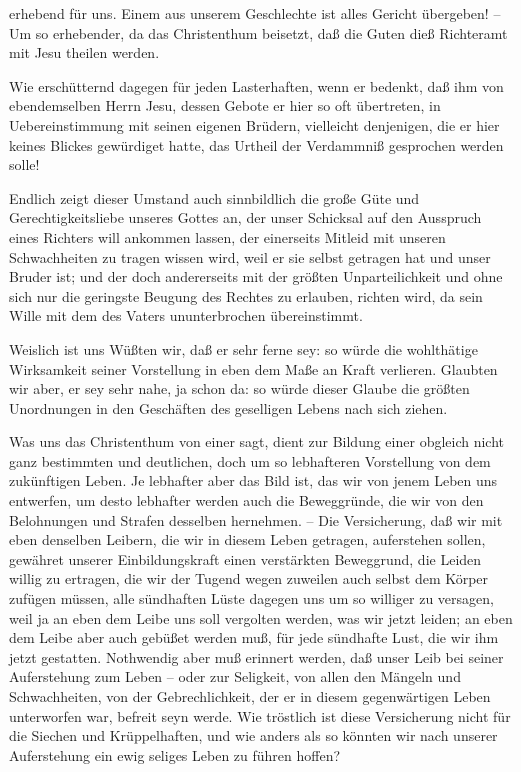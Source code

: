 \begin{aufza}
\begin{aufzb}
\begin{aufzc}
\item erhebend für uns. Einem aus unserem Geschlechte ist alles Gericht übergeben! -- Um so erhebender, da das Christenthum beisetzt, daß die Guten dieß Richteramt mit Jesu theilen werden.
\item Wie erschütternd dagegen für jeden Lasterhaften, wenn er bedenkt, daß ihm von ebendemselben Herrn Jesu, dessen Gebote er hier so oft übertreten, in Uebereinstimmung mit seinen eigenen Brüdern, vielleicht denjenigen, die er hier keines Blickes gewürdiget hatte, das Urtheil der Verdammniß gesprochen werden solle!
\item Endlich zeigt dieser Umstand auch sinnbildlich die große Güte und Gerechtigkeitsliebe unseres Gottes an, der unser Schicksal auf den Ausspruch eines Richters will ankommen lassen, der einerseits Mitleid mit unseren Schwachheiten zu tragen wissen wird, weil er sie selbst getragen hat und unser Bruder ist; und der doch andererseits mit der größten Unparteilichkeit und ohne sich nur die geringste Beugung des Rechtes zu erlauben, richten wird, da sein Wille mit dem des Vaters ununterbrochen übereinstimmt.
\end{aufzc}
\item Weislich ist uns  Wüßten wir, daß er sehr ferne sey: so würde die wohlthätige Wirksamkeit seiner Vorstellung in eben dem Maße an Kraft verlieren. Glaubten wir aber, er sey sehr nahe, ja schon da: so würde dieser Glaube die größten Unordnungen in den Geschäften des geselligen Lebens nach sich ziehen.
\item Was uns das Christenthum von einer  sagt, dient zur Bildung einer obgleich nicht ganz bestimmten und deutlichen, doch um so lebhafteren Vorstellung von dem zukünftigen Leben. Je lebhafter aber das Bild ist, das wir von jenem Leben uns entwerfen, um desto lebhafter werden auch die Beweggründe, die wir von den Belohnungen und Strafen desselben hernehmen. -- Die Versicherung, daß wir mit eben denselben Leibern, die wir in diesem Leben getragen, auferstehen sollen, gewähret unserer Einbildungskraft einen verstärkten Beweggrund, die Leiden willig zu ertragen, die wir der Tugend wegen zuweilen auch selbst dem Körper zufügen müssen, alle sündhaften Lüste dagegen uns um so williger zu versagen, weil ja an eben dem Leibe uns soll vergolten werden, was wir jetzt leiden; an eben dem Leibe aber auch gebüßet werden muß, für jede sündhafte Lust, die wir ihm jetzt gestatten. Nothwendig aber muß erinnert werden, daß unser Leib bei seiner Auferstehung zum Leben -- oder zur Seligkeit, von allen den Mängeln und Schwachheiten, von der Gebrechlichkeit, der er in diesem gegenwärtigen Leben unterworfen war, befreit seyn werde. Wie tröstlich ist diese Versicherung nicht für die Siechen und Krüppelhaften, und wie anders als so könnten wir nach unserer Auferstehung ein ewig seliges Leben zu führen hoffen?

\end{aufzb}
\end{aufza}
